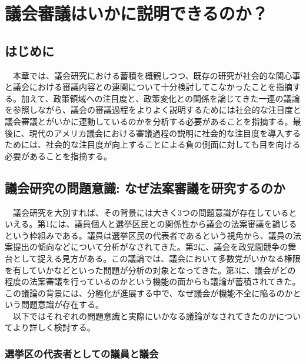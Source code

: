 \newpage
\section{議会審議はいかに説明できるのか？}
\subsection{はじめに}
　本章では、議会研究における蓄積を概観しつつ、既存の研究が社会的な関心事と議会における審議内容との連関について十分検討してこなかったことを指摘する。加えて、政策領域への注目度と、政策変化との関係を論じてきた一連の議論を参照しながら、議会の審議過程をよりよく説明するためには社会的な注目度と議会審議とがいかに連動しているのかを分析する必要があることを指摘する。最後に、現代のアメリカ議会における審議過程の説明に社会的な注目度を導入するためには、社会的な注目度が向上することによる負の側面に対しても目を向ける必要があることを指摘する。\\
\subsection{議会研究の問題意識: なぜ法案審議を研究するのか}
　議会研究を大別すれば、その背景には大きく3つの問題意識が存在しているといえる。第1には、議員個人と選挙区民との関係性から議会の法案審議を論じるという枠組みである。\citep*{Fenno1977-se,Fenno2000-up}議員は選挙区民の代表者であるという視角から、議員の法案提出の傾向などについて分析がなされてきた。第2に、議会を政党間競争の舞台として捉える見方がある。\citep*{Rohde1991-da,Aldrich1995-xf,Cox2005-pn,Cox2007-xq,Poole2017-ir}この議論では、議会において多数党がいかなる権限を有していかなどといった問題が分析の対象となってきた。第3に、議会がどの程度の法案審議を行っているのかという機能の面からも議論が蓄積されてきた。\citep*{Mayhew1991-rq,Binder2003-bn,Binder2017-wr}この議論の背景には、分極化が進展する中で、なぜ議会が機能不全に陥るのかという問題意識が存在する。\\
　以下ではそれぞれの問題意識と実際にいかなる議論がなされてきたのかについてより詳しく検討する。\\

\subsubsection{選挙区の代表者としての議員と議会}
